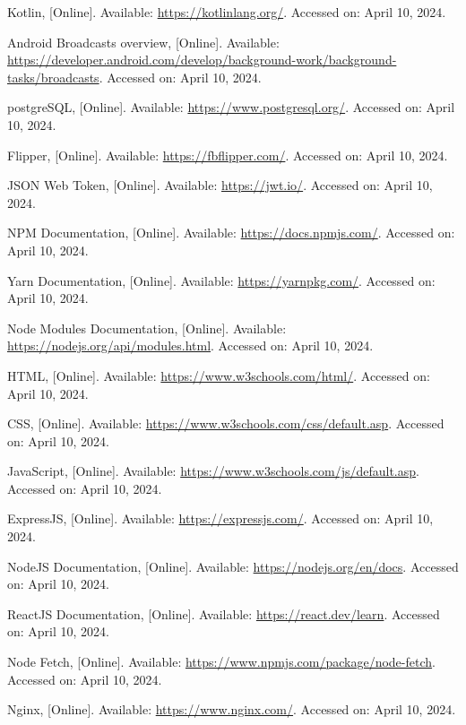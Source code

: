 \begin{thebibliography}{1}
    Kotlin, [Online]. Available: \url{https://kotlinlang.org/}. Accessed on: April 10, 2024.

    Android Broadcasts overview, [Online]. Available: \url{https://developer.android.com/develop/background-work/background-tasks/broadcasts}. Accessed on: April 10, 2024.

    postgreSQL, [Online]. Available: \url{https://www.postgresql.org/}. Accessed on: April 10, 2024.

    Flipper, [Online]. Available: \url{https://fbflipper.com/}. Accessed on: April 10, 2024.

    JSON Web Token, [Online]. Available: \url{https://jwt.io/}. Accessed on: April 10, 2024.

    NPM Documentation, [Online]. Available: \url{https://docs.npmjs.com/}. Accessed on: April 10, 2024.

    Yarn Documentation, [Online]. Available: \url{https://yarnpkg.com/}. Accessed on: April 10, 2024.

    Node Modules Documentation, [Online]. Available: \url{https://nodejs.org/api/modules.html}. Accessed on: April 10, 2024.

    HTML, [Online]. Available: \url{https://www.w3schools.com/html/}. Accessed on: April 10, 2024.

    CSS, [Online]. Available: \url{https://www.w3schools.com/css/default.asp}. Accessed on: April 10, 2024.

    JavaScript, [Online]. Available: \url{https://www.w3schools.com/js/default.asp}. Accessed on: April 10, 2024.

    ExpressJS, [Online]. Available: \url{https://expressjs.com/}. Accessed on: April 10, 2024.

    NodeJS Documentation, [Online]. Available: \url{https://nodejs.org/en/docs}. Accessed on: April 10, 2024.

    ReactJS Documentation, [Online]. Available: \url{https://react.dev/learn}. Accessed on: April 10, 2024.

    Node Fetch, [Online]. Available: \url{https://www.npmjs.com/package/node-fetch}. Accessed on: April 10, 2024.

    Nginx, [Online]. Available: \url{https://www.nginx.com/}. Accessed on: April 10, 2024.


\end{thebibliography}
